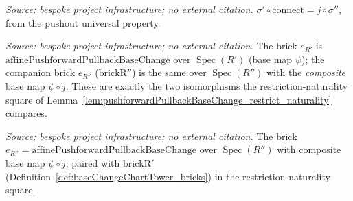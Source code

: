 \begin{lemma}\leanok
  \label{lem:baseChangeChartTower_inr_connect}
  \textit{Source: bespoke project infrastructure; no external citation.}
  \(\sigma' \circ \mathrm{connect} = j \circ \sigma''\), from the pushout
  universal property.
\end{lemma}

\begin{definition}\leanok
  \label{def:baseChangeChartTower_bricks}
  \textit{Source: bespoke project infrastructure; no external citation.}
  The brick \(e_{R'}\) is \(\mathrm{affinePushforwardPullbackBaseChange}\) over
  \(\operatorname{Spec}(R')\) (base map \(\psi\)); the companion brick \(e_{R''}\)
  (\(\mathrm{brickR''}\)) is the same over \(\operatorname{Spec}(R'')\) with the
  \emph{composite} base map \(\psi \circ j\). These are exactly the two isomorphisms the
  restriction-naturality square of
  Lemma~\ref{lem:pushforwardPullbackBaseChange_restrict_naturality} compares.
\end{definition}

\begin{definition}\leanok
  \label{def:baseChangeChartTower_brickRpp}
  \textit{Source: bespoke project infrastructure; no external citation.}
  The brick \(e_{R''} = \mathrm{affinePushforwardPullbackBaseChange}\) over
  \(\operatorname{Spec}(R'')\) with composite base map \(\psi \circ j\); paired with
  \(\mathrm{brickR'}\) (Definition~\ref{def:baseChangeChartTower_bricks}) in the
  restriction-naturality square.
\end{definition}

